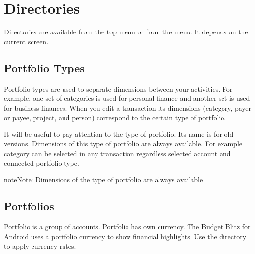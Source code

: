 \documentclass[a4paper,10pt,english]{sphinxmanual}
\begin{document}
\chapter{Directories}
\label{\detokenize{directories:directories}}\label{\detokenize{directories:chapter-directories}}\label{\detokenize{directories::doc}}
Directories are available from the top menu or from the  menu.
It depends on the current screen.

\noindent{}

\noindent{}


\section{Portfolio Types}
\label{\detokenize{directories:portfolio-types}}
Portfolio types are used to separate dimensions between your activities. For example, one set of
categories is used for personal finance and another set is used for business finances. When you
edit a transaction its dimensions (category,  payer or payee, project, and person) correspond
to the certain type of portfolio.

\noindent{}

\noindent{}

\noindent{}

It will be useful to pay attention to the  type of portfolio. Its name is 
for old versions. Dimensions of this type of portfolio are always available. For example 
category can be selected in any transaction regardless selected account and connected portfolio type.

\begin{sphinxadmonition}{note}{Note:}
Dimensions of the  type of portfolio are always available
\end{sphinxadmonition}


\section{Portfolios}
\label{\detokenize{directories:portfolios}}
Portfolio is a group of accounts. Portfolio has own currency. The Budget Blitz for Android uses a portfolio currency
to show financial highlights. Use the  directory to apply currency rates.
\end{document}
